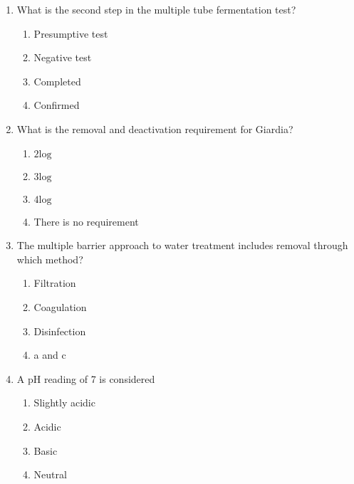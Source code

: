 \documentclass{article}
\begin{document}
\begin{enumerate}[1.]
\item  What is the second step in the multiple tube fermentation test?\\
\begin{enumerate}
\item Presumptive test\\
\item Negative test\\
\item Completed\\
\item Confirmed
\end{enumerate}

\item What is the removal and deactivation requirement for Giardia?\\
\begin{enumerate}
\item $2 \mathrm{log}$\\
\item $3 \mathrm{log}$\\
\item $4 \mathrm{log}$\\
\item There is no requirement
\end{enumerate}

\item  The multiple barrier approach to water treatment includes removal through which method?\\
\begin{enumerate}
\item Filtration\\
\item Coagulation\\
\item Disinfection\\
\item a and c
\end{enumerate}

\item  A pH reading of 7 is considered\\
\begin{enumerate}
\item Slightly acidic\\
\item Acidic\\
\item Basic\\
\item Neutral
\end{enumerate}


\end{enumerate}
\end{document}
